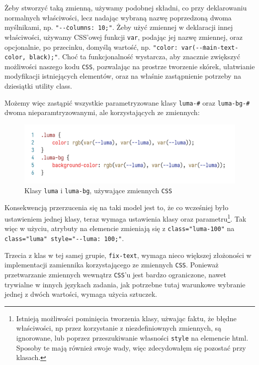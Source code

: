 \documentclass[licencjacka]{pracadypl}
\begin{document}
Żeby stworzyć taką zmienną, używamy podobnej składni, co przy deklarowaniu normalnych właściwości, lecz nadając wybraną nazwę poprzedzoną dwoma myślnikami, np. \texttt{"-\.-columns: 10;"}. Żeby użyć zmiennej w deklaracji innej właściwości, używamy CSS'owej funkcji \texttt{var}, podając jej nazwę zmiennej, oraz opcjonalnie, po przecinku, domyślą wartość, np. \texttt{"color: var(-\.-main-text-color, black);"}.
Choć ta funkcjonalność wystarcza, aby znacznie zwiększyć możliwości naszego kodu \texttt{CSS}, pozwalając na prostrze tworzenie skórek, ułatwianie modyfikacji istniejących elementów, oraz na właśnie zastąpnienie potrzeby na dziesiątki utility class.

Możemy więc zastąpić wszystkie parametryzowane klasy \texttt{luma-\#} oraz \texttt{luma-bg-\#} dwoma nieparamtryzowanymi, ale korzystających ze zmiennych:

\begin{figure}[H]
  \centering
  \includegraphics[width=\linewidth]{images/code-css-luma-vars.png}
  \caption{Klasy \texttt{luma} i \texttt{luma-bg}, używające zmiennych \texttt{CSS}}
  \label{fig:css-css-luma-vars}
\end{figure}

Konsekwencją przerzucenia się na taki model jest to, że co wcześniej było ustawieniem jednej klasy, teraz wymaga ustawienia klasy oraz parametru\footnote{Istnieją możliwości pominięcia tworzenia klasy, użwając faktu, że błędne właściwości, np przez korzystanie z niezdefiniownych zmiennych, są ignorowane, lub poprzez przeszukiwanie własności \texttt{style} na elemencie html. Sposoby te mają również swoje wady, więc zdecydowałęm się pozostać przy klasach.}. Tak więc w użyciu, atrybuty na elemencie zmieniają się z \texttt{class="luma-100"} na \texttt{class="luma" style="-\.-luma: 100;"}.

Trzecia z klas w tej samej grupie, \texttt{fix-text}, wymaga nieco większej złożoności w implementacji zamiennika korzystającego ze zmiennych \texttt{CSS}. Ponieważ przetwarzanie zmiennych wewnątrz \texttt{CSS}'u jest bardzo ograniczone, nawet trywialne w innych językach zadania, jak potrzebne tutaj warunkowe wybranie jednej z dwóch wartości, wymaga użycia sztuczek.
\end{document}
